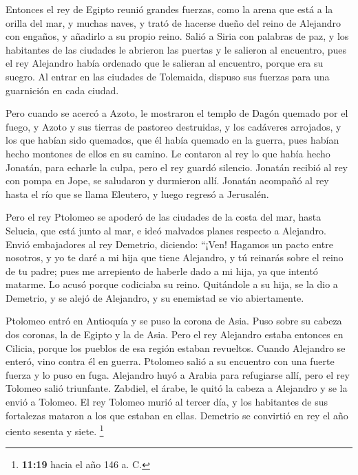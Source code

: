  Entonces el rey de Egipto reunió grandes fuerzas, como la
arena que está a la orilla del mar, y muchas naves, y trató de hacerse
dueño del reino de Alejandro con engaños, y añadirlo a su propio reino.
 Salió a Siria con palabras de paz, y los habitantes de
las ciudades le abrieron las puertas y le salieron al encuentro, pues el
rey Alejandro había ordenado que le salieran al encuentro, porque era su
suegro.  Al entrar en las ciudades de Tolemaida, dispuso
sus fuerzas para una guarnición en cada ciudad.

 Pero cuando se acercó a Azoto, le mostraron el templo de
Dagón quemado por el fuego, y Azoto y sus tierras de pastoreo
destruidas, y los cadáveres arrojados, y los que habían sido quemados,
que él había quemado en la guerra, pues habían hecho montones de ellos
en su camino.  Le contaron al rey lo que había hecho
Jonatán, para echarle la culpa, pero el rey guardó silencio.
 Jonatán recibió al rey con pompa en Jope, se saludaron y
durmieron allí.  Jonatán acompañó al rey hasta el río que
se llama Eleutero, y luego regresó a Jerusalén.

 Pero el rey Ptolomeo se apoderó de las ciudades de la
costa del mar, hasta Selucia, que está junto al mar, e ideó malvados
planes respecto a Alejandro.  Envió embajadores al rey
Demetrio, diciendo: ``¡Ven! Hagamos un pacto entre nosotros, y yo te
daré a mi hija que tiene Alejandro, y tú reinarás sobre el reino de tu
padre;  pues me arrepiento de haberle dado a mi hija, ya
que intentó matarme.  Lo acusó porque codiciaba su reino.
 Quitándole a su hija, se la dio a Demetrio, y se alejó
de Alejandro, y su enemistad se vio abiertamente.

 Ptolomeo entró en Antioquía y se puso la corona de Asia.
Puso sobre su cabeza dos coronas, la de Egipto y la de Asia.
 Pero el rey Alejandro estaba entonces en Cilicia, porque
los pueblos de esa región estaban revueltos.  Cuando
Alejandro se enteró, vino contra él en guerra. Ptolomeo salió a su
encuentro con una fuerte fuerza y lo puso en fuga. 
Alejandro huyó a Arabia para refugiarse allí, pero el rey Tolomeo salió
triunfante.  Zabdiel, el árabe, le quitó la cabeza a
Alejandro y se la envió a Tolomeo.  El rey Tolomeo murió
al tercer día, y los habitantes de sus fortalezas mataron a los que
estaban en ellas.  Demetrio se convirtió en rey el año
ciento sesenta y siete. \footnote{\textbf{11:19} hacia el año 146 a. C.}

